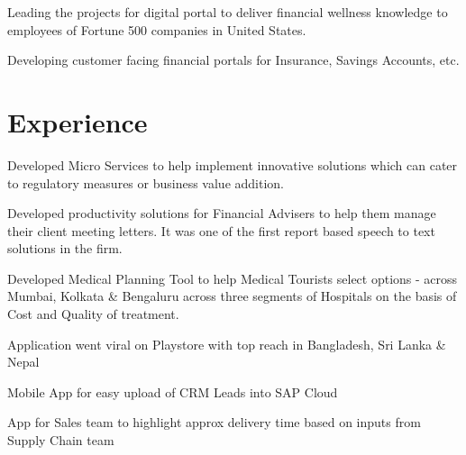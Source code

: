 \documentclass[]{deedy-resume-openfont}
\begin{document}
\begin{minipage}[t]{0.66\textwidth} 


\vspace{\topsep} %
\begin{tightemize}
\item Leading the projects for digital portal to deliver financial wellness knowledge to employees of Fortune 500 companies in United States.
\item Developing customer facing financial portals for Insurance, Savings Accounts, etc.
\end{tightemize}
\sectionsep

\section{Experience}
\begin{tightemize}
\item Developed Micro Services to help implement innovative solutions which can cater to regulatory measures or business value addition.
\item Developed productivity solutions for Financial Advisers to help them manage their client meeting letters. It was one of the first report based speech to text solutions in the firm.
\end{tightemize}
\sectionsep

\begin{tightemize}
\item Developed Medical Planning Tool to help Medical Tourists select options - across Mumbai, Kolkata \& Bengaluru across three segments of Hospitals on the basis of Cost and Quality of treatment.
\item Application went viral on Playstore with top reach in Bangladesh, Sri Lanka \& Nepal
\end{tightemize}
\sectionsep

\begin{tightemize}
\item Mobile App for easy upload of CRM Leads into SAP Cloud
\item App for Sales team to highlight approx delivery time based on inputs from Supply Chain team
\end{tightemize}
\sectionsep


\end{minipage}
\end{document}
